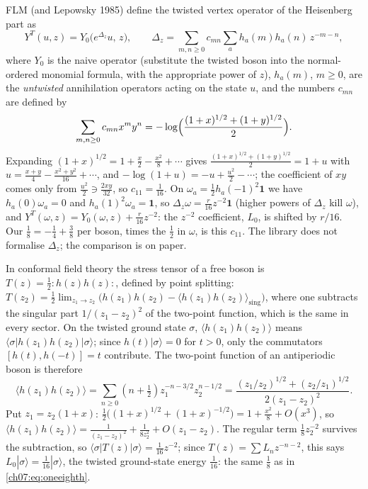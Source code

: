 FLM (and Lepowsky 1985) define the twisted vertex operator of the Heisenberg part as
\begin{equation*}
  Y^T(u,z) = Y_0\bigl(e^{\Delta_z}u,\,z\bigr),\qquad
  \Delta_z = \sum_{m,n\ge0}c_{mn}\sum_a h_a(m)h_a(n)\,z^{-m-n},
\end{equation*}
where $Y_0$ is the naive operator (substitute the twisted boson into the normal-ordered
monomial formula, with the appropriate power of $z$), $h_a(m)$, $m\ge0$, are the \emph{untwisted}
annihilation operators acting on the state $u$, and the numbers $c_{mn}$ are defined by
\begin{equation*}
  \sum_{m,n\ge0}c_{mn}x^my^n = -\log\Bigl(\frac{(1+x)^{1/2}+(1+y)^{1/2}}{2}\Bigr).
\end{equation*}
Expanding $(1+x)^{1/2} = 1+\frac x2-\frac{x^2}8+\cdots$ gives $\frac{(1+x)^{1/2}+(1+y)^{1/2}}2 =
1+u$ with $u = \frac{x+y}4-\frac{x^2+y^2}{16}+\cdots$, and $-\log(1+u) = -u+\frac{u^2}2-\cdots$;
the coefficient of $xy$ comes only from $\frac{u^2}{2} \ni \frac{2xy}{32}$, so
$c_{11} = \frac1{16}$. On $\omega_a = \frac12h_a(-1)^2\mathbf 1$ we have $h_a(0)\omega_a=0$ and
$h_a(1)^2\omega_a = \mathbf 1$, so $\Delta_z\omega = \frac r{16}z^{-2}\mathbf 1$ (higher powers of
$\Delta_z$ kill $\omega$), and
$Y^T(\omega,z) = Y_0(\omega,z)+\frac r{16}z^{-2}$: the $z^{-2}$ coefficient, $L_0$, is shifted by
$r/16$. Our $\frac18 = -\frac14+\frac38$ per boson, times the $\frac12$ in $\omega$, is this
$c_{11}$. The library does not formalise $\Delta_z$; the comparison is on paper.

\begin{remark}
In conformal field theory the stress tensor of a free boson is $T(z) = \frac12{:}h(z)h(z){:}$,
defined by point splitting: $T(z_2) = \frac12\lim_{z_1\to z_2}\bigl(h(z_1)h(z_2) -
\langle h(z_1)h(z_2)\rangle_{\mathrm{sing}}\bigr)$, where one subtracts the singular part
$1/(z_1-z_2)^2$ of the two-point function, which is the same in every sector. On the twisted
ground state $\sigma$, $\langle h(z_1)h(z_2)\rangle$ means $\langle\sigma|h(z_1)h(z_2)|\sigma
\rangle$; since $h(t)|\sigma\rangle = 0$ for $t>0$, only the commutators $[h(t),h(-t)] = t$
contribute. The two-point function of an antiperiodic boson is therefore
\begin{equation*}
  \langle h(z_1)h(z_2)\rangle = \sum_{n\ge0}(n+\tfrac12)z_1^{-n-3/2}z_2^{n-1/2}
  = \frac{(z_1/z_2)^{1/2}+(z_2/z_1)^{1/2}}{2(z_1-z_2)^2}.
\end{equation*}
Put $z_1 = z_2(1+x)$: $\frac12\bigl((1+x)^{1/2}+(1+x)^{-1/2}\bigr) = 1+\frac{x^2}8+O(x^3)$, so
$\langle h(z_1)h(z_2)\rangle = \frac1{(z_1-z_2)^2}+\frac1{8z_2^2}+O(z_1-z_2)$. The regular term
$\frac18z_2^{-2}$ survives the subtraction, so $\langle\sigma|T(z)|\sigma\rangle =
\frac1{16}z^{-2}$; since $T(z) = \sum L_nz^{-n-2}$, this says $L_0|\sigma\rangle =
\frac1{16}|\sigma\rangle$, the twisted ground-state energy $\frac1{16}$: the same $\frac18$ as in \eqref{ch07:eq:oneeighth}.
\end{remark}

